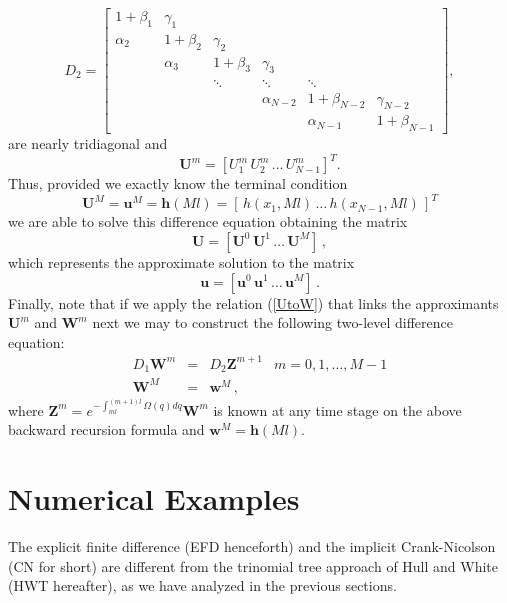 \begin{equation}
\nonumber
D_2 =\left[\begin{array}{cccccc}
1+\beta_1 & \gamma_1 &  &  &  & \\
\alpha_2 & 1+ \beta_2 & \gamma_2 & & & \\
& \alpha_3 & 1+ \beta_3 & \gamma_3 & & \\
& & \ddots & \ddots & \ddots & \\
& & & \alpha_{N-2} & 1+\beta_{N-2} & \gamma_{N-2} \\
& & & & \alpha_{N-1} & 1+ \beta_{N-1} 
\end{array}\right], 
\end{equation}
are nearly tridiagonal and
\begin{equation}
\nonumber
\boldsymbol{U}^m = \left[ U^m_1 \, U^m_2 \, \dots \, U^m_{N-1} \right]^T.
\end{equation}
Thus, provided we exactly know the terminal condition 
$$
\boldsymbol{U}^M =
\boldsymbol{u}^M = \boldsymbol{h}(Ml) = [\, h(x_1 , Ml)  \,
 \dots \, h(x_{N-1}, Ml) \,]^T
$$ 
we are able to solve this difference equation obtaining the matrix
$$
\boldsymbol{U} = \left[ \boldsymbol{U}^0 \, \boldsymbol{U}^1 \, \dots
  \, \boldsymbol{U}^M \right]  \, ,
$$
which represents the approximate solution to the matrix 
$$
\boldsymbol{u} = \left[ \boldsymbol{u}^0 \, \boldsymbol{u}^1 \, \dots
  \, \boldsymbol{u}^M \right] \, .
$$
Finally, note that if we apply the relation (\ref{UtoW}) that links
the approximants $\boldsymbol{U}^m$ and $\boldsymbol{W}^m$ next we may
to construct the following two-level difference equation: 
\begin{equation}
\label{CNmatrixW}
\begin{array}{rcll}
 D_1 \boldsymbol{W}^m & = & D_2 \boldsymbol{Z}^{m+1} & m = 0, 1,
 \dots, M-1\\
 \boldsymbol{W}^M & = & \boldsymbol{w}^M \, , & 
\end{array}
\end{equation}
where $ \boldsymbol{Z}^m = e^{-\int^{(m+1)l}_{ml} \Omega(q)
  dq}\boldsymbol{W}^m $ is known at any time stage on the above 
backward recursion formula and $\boldsymbol{w}^M = \boldsymbol{h}(Ml)$. 

\section{Numerical Examples}
The explicit finite difference (EFD henceforth) and the implicit
Crank-Nicolson (CN for short) are different from the trinomial tree
approach  of Hull and White \cite{HW:1994} (HWT hereafter), as we have
analyzed in the previous sections. 

